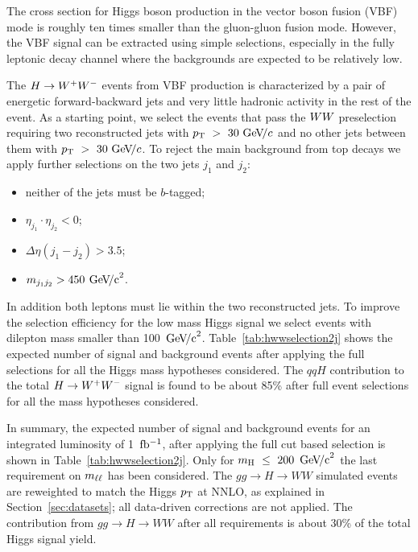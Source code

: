 The cross section for Higgs boson production in the vector boson fusion (VBF)
mode is roughly ten times smaller than the gluon-gluon fusion mode.
However, the VBF signal can be extracted
using simple selections, especially in the fully leptonic decay channel
where the backgrounds are expected to be relatively low.

The $H\to W^+W^-$ events from VBF production is characterized by a pair of energetic 
forward-backward jets and very little hadronic activity in the rest of the event. 
As a starting point, we select the events that pass the $WW$ preselection 
requiring two reconstructed jets with $p_\mathrm{T}~>~30~\mathrm{Ge\kern -0.1em V}\!/c$ and no other jets between 
them with $p_\mathrm{T}~>~30~\mathrm{Ge\kern -0.1em V}\!/c$. To reject the main background from top decays we 
apply further selections on the two jets $j_1$ and $j_2$:
\begin{itemize}
  \item neither of the jets must be $b$-tagged;
  \item $\eta_{j_1}\cdot\eta_{j_2} < 0$;
  \item $\Delta\eta (j_1-j_2) > 3.5$;
  \item $m_{j_1j_2} > 450\:\,\mathrm{Ge\kern -0.1em V\!/c}^2$.
\end{itemize}
In addition both leptons must lie within the two reconstructed jets. To improve 
the selection efficiency for the low mass Higgs signal we select 
events with dilepton mass smaller than 100 $\,\mathrm{Ge\kern -0.1em V\!/c}^2$. Table~\ref{tab:hwwselection2j} shows the 
expected number of signal and background events after applying the full selections for 
all the Higgs mass hypotheses considered. 
The $qqH$ contribution to the total $H\to W^+W^-$ signal is found to be about 
85\% after full event selections for all the mass hypotheses considered. 

In summary, the expected number of signal and background events for an integrated luminosity of 1~$\mathrm{fb^{-1}}$, 
after applying the full cut based selection is shown in Table~\ref{tab:hwwselection2j}. Only for 
$m_{\mathrm{H}}~\leq~200~\,\mathrm{Ge\kern -0.1em V\!/c}^2$ the last requirement on $m_{\ell\ell}$ has been considered.
The $gg \to H \to WW$ simulated events are reweighted to match the Higgs $p_\mathrm{T}$ at NNLO, as explained 
in Section~\ref{sec:datasets}; all data-driven corrections are not applied. The contribution 
from $gg \to H \to WW$ after all requirements is about 30\% of the total Higgs signal yield.

